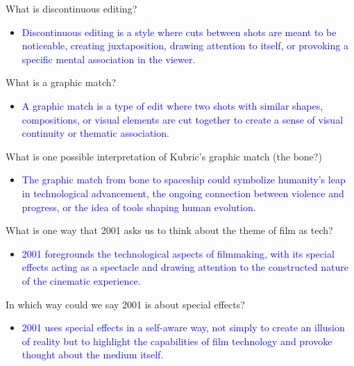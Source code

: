 \documentclass[11pt,fleqn]{book}
\begin{document}
\begin{exercise}
What is discontinuous editing?
\begin{itemize}
\item \textcolor{blue}{Discontinuous editing is a style where cuts between shots are meant to be noticeable, creating juxtaposition, drawing attention to itself, or provoking a specific mental association in the viewer.}
\end{itemize}
\end{exercise}

\begin{exercise}
What is a graphic match?
\begin{itemize}
\item \textcolor{blue}{A graphic match is a type of edit where two shots with similar shapes, compositions, or visual elements are cut together to create a sense of visual continuity or thematic association.}
\end{itemize}
\end{exercise}

\begin{exercise}
What is one possible interpretation of Kubric's graphic match (the bone?)
\begin{itemize}
\item \textcolor{blue}{The graphic match from bone to spaceship could symbolize humanity's leap in technological advancement, the ongoing connection between violence and progress, or the idea of  tools shaping human evolution.}
\end{itemize}
\end{exercise}

\begin{exercise}
What is one way that 2001 asks us to think about the theme of film as tech?
\begin{itemize}
\item \textcolor{blue}{2001 foregrounds the technological aspects of filmmaking, with its special effects acting as a spectacle and drawing attention to the constructed nature of the cinematic experience.}
\end{itemize}
\end{exercise}

\begin{exercise}
In which way could we say 2001 is about special effects?
\begin{itemize}
\item \textcolor{blue}{2001  uses special effects in a self-aware way, not simply to create an illusion of reality but to highlight the capabilities of film technology and provoke thought about the medium itself.}
\end{itemize}
\end{exercise}
\end{document}

